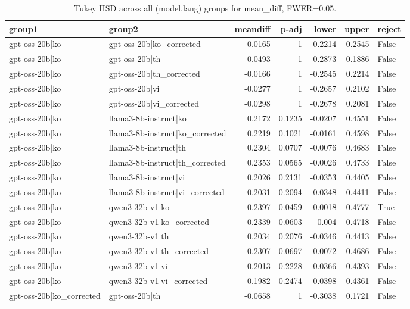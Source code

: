 \begin{table}
\caption{Tukey HSD across all (model,lang) groups for mean_diff, FWER=0.05.}
\label{tab:tukey_all_models_all_langs_mean_diff}
\begin{tabular}{l l r r r r l}
\toprule
group1 & group2 & meandiff & p-adj & lower & upper & reject \\
\midrule
gpt-oss-20b|ko & gpt-oss-20b|ko_corrected & 0.0165 & 1 & -0.2214 & 0.2545 & False \\
gpt-oss-20b|ko & gpt-oss-20b|th & -0.0493 & 1 & -0.2873 & 0.1886 & False \\
gpt-oss-20b|ko & gpt-oss-20b|th_corrected & -0.0166 & 1 & -0.2545 & 0.2214 & False \\
gpt-oss-20b|ko & gpt-oss-20b|vi & -0.0277 & 1 & -0.2657 & 0.2102 & False \\
gpt-oss-20b|ko & gpt-oss-20b|vi_corrected & -0.0298 & 1 & -0.2678 & 0.2081 & False \\
gpt-oss-20b|ko & llama3-8b-instruct|ko & 0.2172 & 0.1235 & -0.0207 & 0.4551 & False \\
gpt-oss-20b|ko & llama3-8b-instruct|ko_corrected & 0.2219 & 0.1021 & -0.0161 & 0.4598 & False \\
gpt-oss-20b|ko & llama3-8b-instruct|th & 0.2304 & 0.0707 & -0.0076 & 0.4683 & False \\
gpt-oss-20b|ko & llama3-8b-instruct|th_corrected & 0.2353 & 0.0565 & -0.0026 & 0.4733 & False \\
gpt-oss-20b|ko & llama3-8b-instruct|vi & 0.2026 & 0.2131 & -0.0353 & 0.4405 & False \\
gpt-oss-20b|ko & llama3-8b-instruct|vi_corrected & 0.2031 & 0.2094 & -0.0348 & 0.4411 & False \\
gpt-oss-20b|ko & qwen3-32b-v1|ko & 0.2397 & 0.0459 & 0.0018 & 0.4777 & True \\
gpt-oss-20b|ko & qwen3-32b-v1|ko_corrected & 0.2339 & 0.0603 & -0.004 & 0.4718 & False \\
gpt-oss-20b|ko & qwen3-32b-v1|th & 0.2034 & 0.2076 & -0.0346 & 0.4413 & False \\
gpt-oss-20b|ko & qwen3-32b-v1|th_corrected & 0.2307 & 0.0697 & -0.0072 & 0.4686 & False \\
gpt-oss-20b|ko & qwen3-32b-v1|vi & 0.2013 & 0.2228 & -0.0366 & 0.4393 & False \\
gpt-oss-20b|ko & qwen3-32b-v1|vi_corrected & 0.1982 & 0.2474 & -0.0398 & 0.4361 & False \\
gpt-oss-20b|ko_corrected & gpt-oss-20b|th & -0.0658 & 1 & -0.3038 & 0.1721 & False \\

\end{tabular}
\end{table}
